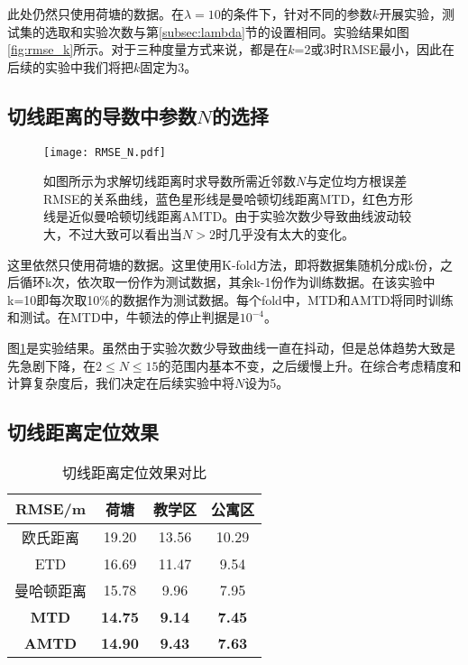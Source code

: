 此处仍然只使用荷塘的数据。在$\lambda=10$的条件下，针对不同的参数$k$开展实验，测试集的选取和实验次数与第\ref{subsec:lambda}节的设置相同。实验结果如图\ref{fig:rmse_k}所示。对于三种度量方式来说，都是在$k$=2或3时RMSE最小，因此在后续的实验中我们将把$k$固定为3。

\subsection{切线距离的导数中参数$N$的选择}

\begin{figure}[tb]
	\centering
	\texttt{[image: RMSE\_N.pdf]}
	\caption{如图所示为求解切线距离时求导数所需近邻数$N$与定位均方根误差RMSE的关系曲线，蓝色星形线是曼哈顿切线距离MTD，红色方形线是近似曼哈顿切线距离AMTD。由于实验次数少导致曲线波动较大，不过大致可以看出当$N>2$时几乎没有太大的变化。}
	\label{fig:rmse_n}
\end{figure}

这里依然只使用荷塘的数据。这里使用K-fold方法，即将数据集随机分成k份，之后循环k次，依次取一份作为测试数据，其余k-1份作为训练数据。在该实验中k=10即每次取10\%的数据作为测试数据。每个fold中，MTD和AMTD将同时训练和测试。在MTD中，牛顿法的停止判据是$10^{-4}$。

图\ref{fig:rmse_n}是实验结果。虽然由于实验次数少导致曲线一直在抖动，但是总体趋势大致是先急剧下降，在$2 \le N \le 15$的范围内基本不变，之后缓慢上升。在综合考虑精度和计算复杂度后，我们决定在后续实验中将$N$设为5。

\subsection{切线距离定位效果}

\begin{table}[tbp]
	\caption{切线距离定位效果对比}
	\begin{center}
		\begin{tabular}{cccc}
			\toprule
			RMSE/m &  荷塘 & 教学区 & 公寓区 \\
			\midrule
			欧氏距离 & 19.20 & 13.56 & 10.29 \\
			\midrule
			ETD & 16.69 & 11.47 & 9.54 \\
			\midrule
			曼哈顿距离 & 15.78 & 9.96 & 7.95 \\
			\midrule
			\textbf{MTD} & \textbf{14.75} & \textbf{9.14} & \textbf{7.45} \\
			\midrule
			\textbf{AMTD} & \textbf{14.90} & \textbf{9.43} & \textbf{7.63} \\
			\bottomrule
		\end{tabular}
		\label{tab:td}
	\end{center}
\end{table}

